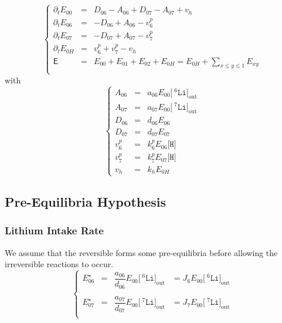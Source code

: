 \documentclass[aps,onecolumn,11pt]{revtex4}
\newcommand{\mychem}[1]{\mathtt{#1}}
\newcommand{\myconc}[1]{\big[#1\big]}
\newcommand{\spLi}[1]{{\!~^{#1}\mychem{Li}}}
\newcommand{\Li}[1]{\myconc{\spLi{#1}}}
\newcommand{\spproton}{\mychem{H}}
\newcommand{\proton}{\myconc{\spproton}}
\newcommand{\myout}[1]{{#1}_{\mathrm{out}}}
\newcommand{\LiOut}[1]{\myout{\Li{#1}}}
\begin{document}
\begin{equation}
\left\lbrace
\begin{array}{rcl}
\partial_t E_{00} & = & D_{06}-A_{06} + D_{07}-A_{07} + v_h\\
\partial_t E_{06} & = & -D_{06}+A_{06} -v^p_6 \\
\partial_t E_{07} & = & -D_{07}+A_{07} -v^p_7\\
\partial_t E_{0H} & = & v^p_6 + v^p_7 - v_h\\
\mathsf{E}       & = & E_{00}+E_{01}+E_{02} + E_{0H} = E_{0H} + {\displaystyle \sum_{x\leq y\leq 1} E_{xy}}\\
\end{array}
\right.
\end{equation}
with
\begin{equation}
\left\lbrace
\begin{array}{rcl}
A_{06} &= &a_{06} E_{00} \LiOut{6}\\
A_{07} &= &a_{07} E_{00} \LiOut{7}\\
D_{06} &= &d_{06} E_{06}\\
D_{07} &= &d_{07} E_{07}\\
v^p_6  &=& k^p_6 E_{06} \proton\\
v^p_7  &=& k^p_7 E_{07} \proton\\
v_h    &=& k_h   E_{0H}
\end{array}
\right.
\end{equation}

\subsection{Pre-Equilibria Hypothesis}
\subsubsection{Lithium Intake Rate}
We assume that the reversible forms some pre-equilibria before allowing the irreversible reactions to occur.
\begin{equation}
\left\lbrace
\begin{array}{rcll}
	E_{06}^\star & = & \dfrac{a_{06}}{d_{06} } E_{00} \LiOut{6} & = J_6 E_{00} \LiOut{6}\\
	\\
	E_{07}^\star & = & \dfrac{a_{07}}{d_{07}  } E_{00} \LiOut{7} & = J_7 E_{00} \LiOut{7}\\
\end{array}
\right.
\end{equation}
\end{document}
